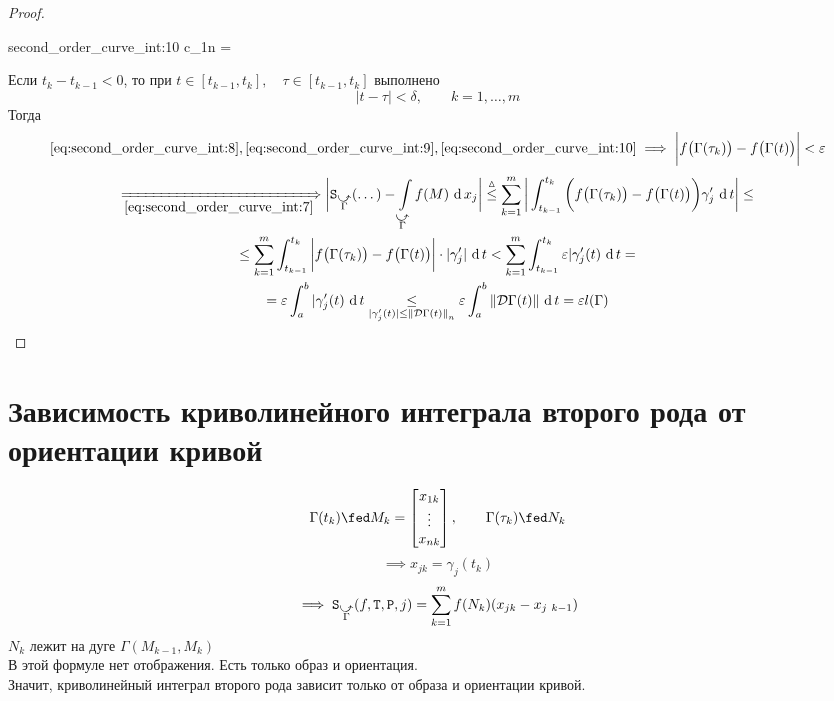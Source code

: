 \begin{proof}
	\begin{equ}{second_order_curve_int:10}
		c_1\sqrt n \delta = \lambda
	\end{equ}
	Если $ t_k - t_{k - 1} < 0 $, то при $ t \in [t_{k - 1}, t_k], \quad \tau \in [t_{k - 1}, t_k] $ выполнено
	$$ |t - \tau| < \delta, \qquad k = 1, \dots, m $$
	Тогда
	$$ \eref{second_order_curve_int:8}, \eref{second_order_curve_int:9}, \eref{second_order_curve_int:10} \implies \bigg| f \big( \Gamma(\tau_k) \big) - f \big( \Gamma(t) \big) \bigg| < \veps $$
	\begin{multline*}
		\underimp{\eref{second_order_curve_int:7}} \bigg| \Sr_{\curvedir\Gamma}(\dots) - \cint[x_j]{\curvedir\Gamma}{f(M)} \bigg| \trile \sum_{k = 1}^m \bigg| \dint[t]{t_{k - 1}}{t_k}{\bigg( f \big( \Gamma(\tau_k) \big) - f \big( \Gamma(t) \big) \bigg)\gamma_j'} \bigg| \le \\
		\le \sum_{k = 1}^m \dint[t]{t_{k - 1}}{t_k}{ \bigg| f \big( \Gamma(\tau_k) \big) - f \big( \Gamma(t) \big) \bigg| \cdot |\gamma_j'|} < \sum_{k = 1}^m \dint[t]{t_{k - 1}}{t_k}{\veps|\gamma_j'(t)} = \\
		= \veps \dint[t]ab{|\gamma_j'(t)} \underset{|\gamma_j'(t)| \le \norm{\mc D\Gamma(t)}_n}\le \veps \dint[t]ab{\norm{\mc D \Gamma(t)}} = \veps l(\Gamma)
	\end{multline*}
\end{proof}

\section{Зависимость криволинейного интеграла второго рода от ориентации кривой}

\begin{implication}
	$$ \Gamma(t_k) \fed M_k = \column{x_{1k}}{x_{nk}}, \qquad \Gamma(\tau_k) \fed N_k $$
	$$ \implies x_{jk} = \gamma_j(t_k) $$
	$$ \implies \Sr_{\curvedir\Gamma}(f, \Teq, \Par, j) = \sum_{k = 1}^m f(N_k)(x_{jk} - x_{j ~ k - 1}) $$
	$ N_k $ лежит на дуге $ \Gamma(M_{k - 1}, M_k) $ \\
	В этой формуле нет отображения. Есть только образ и ориентация. \\
	Значит, криволинейный интеграл второго рода зависит только от образа и ориентации кривой.
\end{implication}

